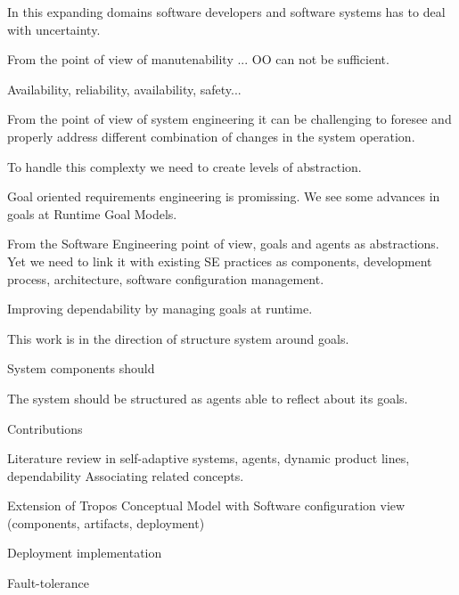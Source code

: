 In this expanding domains software developers and software systems has to deal with uncertainty.




From the point of view of manutenability ...
OO can not be sufficient.

Availability, reliability, availability, safety...

From the point of view of system engineering it can be challenging to foresee and properly address different combination of changes in the system operation.

To handle this complexty we need to create levels of abstraction.



Goal oriented requirements engineering is promissing. We see some advances in goals at
Runtime Goal Models.

From the Software Engineering point of view, goals and agents as abstractions. Yet we need to link it with existing SE practices as components, development process, architecture, software configuration management.

Improving dependability by managing goals at runtime.

This work is in the direction of structure system around goals.

System components should

The system should be structured as agents able to reflect about its goals.


Contributions

Literature review in self-adaptive systems, agents, dynamic product lines, dependability
Associating related concepts.

Extension of Tropos Conceptual Model with Software configuration view (components, artifacts, deployment)



Deployment implementation

Fault-tolerance
